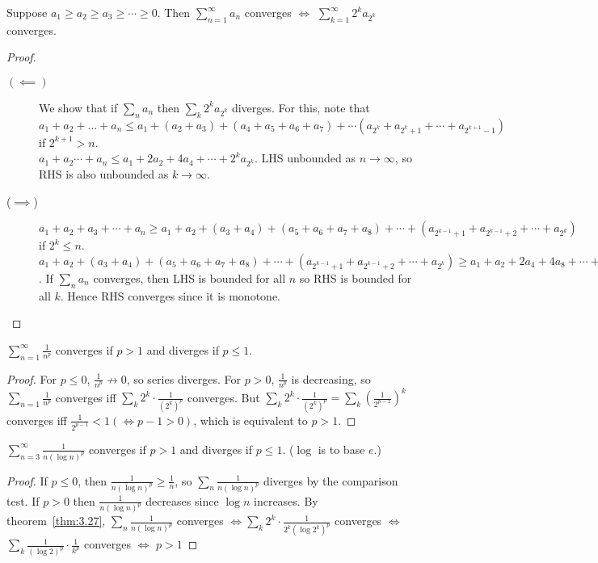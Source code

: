 \begin{theorem}
	\label{thm:3.27}
	Suppose $a_1\ge a_2\ge a_3\ge \cdots \ge 0$. Then $\sum_{n=1}^{\infty}{a_{n}}$ converges $\Leftrightarrow $ $\sum_{k=1}^{\infty}{2^{k}a_{2^{k}}}$ converges.
	\begin{proof}
		\begin{description}
			\item[$(\impliedby )$] We show that if $\sum_{n}{a_{n}}$ then $\sum_{k}{2^{k}a_{2^{k}}}$ diverges.
			      For this, note that $a_1+a_2+\ldots +a_{n}\le a_1+(a_2+a_3)+(a_4+a_5+a_6+a_7)+\cdots (a_{2^{k}}+a_{2^{k}+1}+\cdots + a_{2^{k+1}-1})$ if $2^{k+1}>n$.\\
			      $a_1+a_2 \cdots + a_{n} \le a_1+ 2 a_2 + 4 a_4 + \cdots + 2^{k}a_{2^{k}}$.
			      LHS unbounded as $n\to \infty $, so RHS is also unbounded as $k \to \infty $.

			\item[($\implies$)]
			      $a_1+a_2+a_3+\cdots+a_{n}\ge a_1+a_2+(a_3+a_4)+(a_5+a_6+a_7+a_8)+\cdots +(a_{2^{k-1}+1}+a_{2^{k-1}+2}+ \cdots + a_{2^{k}})$ if $2^{k}\le n$.
			      $a_1+a_2+(a_3+a_4)+(a_5+a_6+a_7+a_8)+\cdots +(a_{2^{k-1}+1}+a_{2^{k-1}+2}+ \cdots + a_{2^{k}})\ge a_1+a_2 + 2a_4 + 4a_8 +\cdots + 2^{k-1}a_{2^{k}}\ge
				      \frac{1}{2}(a_1+2a_2+4a_4+ \cdots +2^{k}a_{2^{k}})
			      $.
			      If $\sum_{n}{a_{n}}$ converges, then LHS is bounded for all $n$ so RHS is bounded for all $k$. Hence RHS converges since it is monotone.
		\end{description}
	\end{proof}
\end{theorem}

\begin{theorem}[$p$-series]
	\label{thm:3.28}
	$\sum_{n=1}^{\infty }{\frac{1}{n^{p}}}$ converges if $p>1$ and diverges if $p\le 1$.
	\begin{proof}
		For $p\le 0$, $\frac{1}{n^{p}} \not \to 0$, so series diverges.
		For $p>0$, $\frac{1}{n^{p}}$ is decreasing, so $\sum_{n=1}{\frac{1}{n^{p}}}$ converges iff $\sum_{k}{2^{k} \cdot \frac{1}{(2^{k})^{p}}}$ converges.
		But $\sum_{k}{2^{k}\cdot \frac{1}{(2^{k})^{p}}}=\sum_{k}{(\frac{1}{2^{p-1}})^{k}}$ converges iff $\frac{1}{2^{p-1}}<1(\Leftrightarrow p-1>0)$, which is equivalent to $p>1$.
	\end{proof}
\end{theorem}
\begin{theorem}
	\label{thm:3.29}
	$\sum_{n=3}^{\infty }{\frac{1}{n(\log{n})^{p}}}$ converges if $p>1$ and diverges if $p\le 1$. ($\log$ is to base $e$.)
	\begin{proof}
		If $p\le 0$, then $\frac{1}{n (\log{n})^{p}}\ge \frac{1}{n}$, so $\sum_{n}{\frac{1}{n(\log{n})^{p}}}$ diverges by the comparison test.
		If $p>0$ then $\frac{1}{n(\log{n})^{p}}$ decreases since $\log{n}$ increases. By theorem~\ref{thm:3.27}, $\sum_{n}{\frac{1}{n(\log{n})^{p}}}$ converges $\Leftrightarrow \sum_{k}{2^{k} \cdot \frac{1}{2^{k}(\log{2^{k}})^{p}}}$ converges  $\Leftrightarrow $  $\sum_{k}{\frac{1}{(\log{2})^{p}} \cdot \frac{1}{k^p}}$ converges $\Leftrightarrow $ $p>1$
	\end{proof}
\end{theorem}

